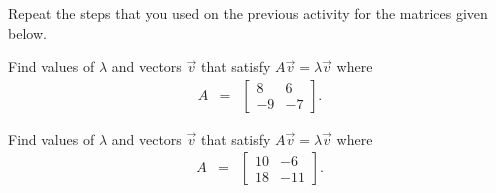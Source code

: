   \begin{problem}

  \item Repeat the steps that you used on the previous activity for
    the matrices given below.
    
    \begin{subproblem}
      
    \item Find values of $\lambda$ and vectors $\vec{v}$ that satisfy
      $A\vec{v}=\lambda\vec{v}$ where 
        \begin{eqnarray*}
          A &  = & 
          \left[ \begin{array}{rr}
               8 &  6 \\
              -9 & -7
            \end{array} \right].
        \end{eqnarray*}

        \vfill
        \clearpage


      \item Find values of $\lambda$ and vectors $\vec{v}$ that satisfy
        $A\vec{v}=\lambda\vec{v}$ where 
        \begin{eqnarray*}
          A & = & 
          \left[ \begin{array}{rr}
              10 &  -6 \\
              18 & -11
            \end{array} \right].
        \end{eqnarray*}

        \vfill
        \clearpage

    \end{subproblem}


\end{problem}

